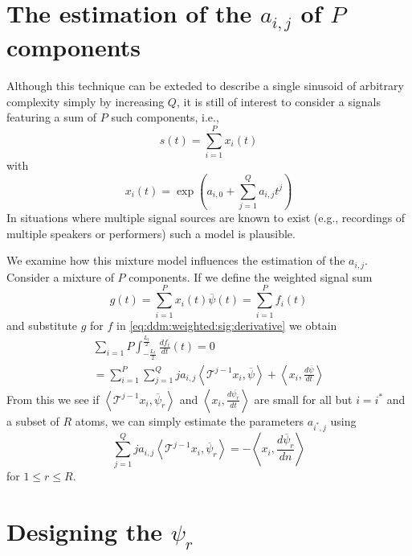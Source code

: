 \documentclass[twoside,a4paper]{article}
\begin{document}
\section{The estimation of the $a_{i,j}$ of $P$ components}

Although this technique can be exteded to describe a single
sinusoid of arbitrary complexity simply by increasing $Q$, it is still of
interest to consider a signals featuring a sum of $P$ such components, i.e.,
%
\[
    s(t) = \sum_{i=1}^{P} x_{i}(t)
\]
%
with
%
\[
    x_{i}(t) = \exp(a_{i,0} + \sum_{j=1}^{Q} a_{i,j} t^j)
\]
%
In situations where multiple signal sources are known to exist (e.g., recordings
of multiple speakers or performers) such a model is plausible.

We examine how this mixture model influences the estimation of the $a_{i,j}$.
Consider a mixture of $P$ components.
If we define the weighted signal sum
%
\[
    g(t) = \sum_{i=1}^{P} x_{i}(t) \overline{\psi}(t) = \sum_{i=1}^{P} f_{i}(t)
\]
%
and substitute $g$ for $f$ in \ref{eq:ddm:weighted:sig:derivative} we obtain
%
\begin{multline}
    \sum_{i=1}{P} \int_{-\frac{L_{t}}{2}}^{\frac{L_{t}}{2}} \frac{df_{i}}{dt}(t) =
    0
    \\ = 
    \sum_{i=1}^{P}
    \sum_{j=1}^{Q} j a_{i,j} 
    \left\langle \mathcal{T}^{j-1} x_i , \overline{\psi} \right\rangle
     + \left\langle x_i, \frac{d\overline{\psi}}{dt} \right\rangle
\end{multline}
%
From this we see if $\left\langle \mathcal{T}^{j-1} x_i , \overline{\psi}_{r}
\right\rangle$ and $\left\langle x_i, \frac{d\overline{\psi_{r}}}{dt} \right\rangle$
are small for all but $i = i^{\ast}$ and a subset of $R$ atoms, we
can simply estimate the parameters $a_{i^{\ast},j}$ using
\[
    \sum_{j=1}^{Q} j a_{i,j} 
    \left\langle \mathcal{T}^{j-1} x_i , \overline{\psi}_{r} \right\rangle
    = -\left\langle x_i, \frac{d\overline{\psi}_{r}}{dn} \right\rangle
\]
for $1 \leq r \leq R$.

\section{Designing the $\psi_{r}$}
\end{document}
